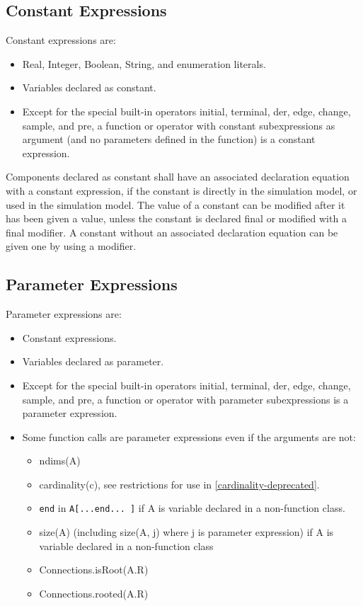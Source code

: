 \documentclass[10pt,a4paper]{report}
\def\doublelabel#1{\label{#1}\hypertarget{#1}{}}
\begin{document}
\subsection{Constant Expressions}\doublelabel{constant-expressions}

Constant expressions are:

\begin{itemize}
\item
  Real, Integer, Boolean, String, and enumeration literals.
\item
  Variables declared as constant.
\item
  Except for the special built-in operators initial, terminal, der,
  edge, change, sample, and pre, a function or operator with constant
  subexpressions as argument (and no parameters defined in the function)
  is a constant expression.
\end{itemize}

Components declared as constant shall have an associated declaration
equation with a constant expression, if the constant is directly in the
simulation model, or used in the simulation model. The value of a
constant can be modified after it has been given a value, unless the
constant is declared final or modified with a final modifier. A constant
without an associated declaration equation can be given one by using a
modifier.

\subsection{Parameter Expressions}\doublelabel{parameter-expressions}

Parameter expressions are:

\begin{itemize}
\item
  Constant expressions.
\item
  Variables declared as parameter.
\item
  Except for the special built-in operators initial, terminal, der,
  edge, change, sample, and pre, a function or operator with parameter
  subexpressions is a parameter expression.
\item
  Some function calls are parameter expressions even if the arguments
  are not:

  \begin{itemize}
  \item
    ndims(A)
  \item
    cardinality(c), see restrictions for use in \ref{cardinality-deprecated}.
  \item
    \lstinline!end! in \lstinline!A[...end... ]! if A is variable declared in a  non-function class.
  \item
    size(A) (including size(A, j) where j is parameter expression) if A
    is variable declared in a non-function class
  \item
    Connections.isRoot(A.R)
  \item
    Connections.rooted(A.R)
  \end{itemize}
\end{itemize}
\end{document}
